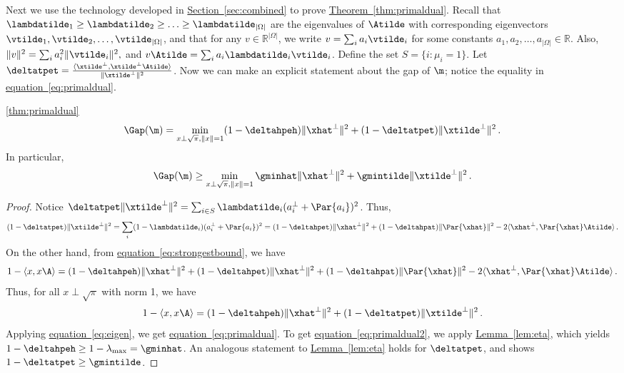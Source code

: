 \documentclass[11pt]{article}
\providecommand{\R}{{\mathbb R}}
\providecommand{\expref}[2]{\texorpdfstring{\hyperref[#2]{#1~\ref{#2}}}{#1~\ref{#2}}}
\providecommand{\expeqref}[2]{\texorpdfstring{\hyperref[#2]{#1~\eqref{#2}}}{#1~\eqref{#2}}}
\providecommand{\Perp}[1]{#1^{\perp}}
\begin{document}
Next we use the technology developed in \expref{Section}{sec:combined} to 
prove \expref{Theorem}{thm:primaldual}. Recall that 
$\lambdatilde_1\geq\lambdatilde_2\geq\ldots\geq 
\lambdatilde_{|\Omega|}$ are the eigenvalues of $\Atilde$ with 
corresponding eigenvectors $\vtilde_1,\vtilde_2,\ldots, 
\vtilde_{|\Omega|}$, and that for any $v \in \R^{|\Omega|}$, we write 
$v=\sum_{i}a_i\vtilde_i$ for some constants $a_1,a_2,\ldots, 
a_{|\Omega|} \in \R$.  Also, $\|v\|^2 = \sum_i a_i^2\|\vtilde_i\|^2,$ 
and $v\Atilde = \sum_i a_i\lambdatilde_i\vtilde_i$. Define the set 
$S=\{i:\mu_i=1\}$. Let 
$\deltatpet = \frac{\langle\Perp{\xtilde},\Perp{\xtilde}\Atilde\rangle}{\|\Perp{\xtilde}\|^2}$.
 Now we can make an explicit statement about the gap 
of $\m$; notice the equality in \expeqref{equation}{eq:primaldual}.  
\begin{customthm}{\ref{thm:primaldual}}
\begin{equation}\label{eq:primaldual}
\Gap(\m)= \min_{x\perp \sqrt{\pi}, \|x\|=1} (1-\deltahpeh)\|\Perp{\xhat}\|^2+
(1-\deltatpet)\|\Perp{\xtilde}\|^2\,.
\end{equation}
In particular,
\begin{equation}\label{eq:primaldual2}
\Gap(\m)\geq \min_{x\perp \sqrt{\pi}, \|x\|=1}  
\gminhat\|\Perp{\xhat}\|^2+\gmintilde\|\Perp{\xtilde}\|^2\,.
\end{equation}
\end{customthm}

\begin{proof}
Notice $\deltatpet\|\Perp{\xtilde}\|^2 = \sum_{i\in S}\lambdatilde_i(\Perp{a_i}+\Par{a_i})^2$.
Thus,
\[(1-\deltatpet)\|\Perp{\xtilde}\|^2 = \sum_{i}(1-\lambdatilde_i)(\Perp{a_i}+\Par{a_i})^2
   = (1-\deltahpet)\|\Perp{\xhat}\|^2 + (1-\deltahpat)\|\Par{\xhat}\|^2 - 
   2\langle \Perp{\xhat},\Par{\xhat}\Atilde\rangle\,.\]
On the other hand, from \expeqref{equation}{eq:strongestbound}, we have
\[1-\langle x,x\A\rangle = (1-\deltahpeh)\|\Perp{\xhat}\|^2+(1-\deltahpet)\|\Perp{\xhat}\|^2+
(1-\deltahpat)\|\Par{\xhat}\|^2 - 2\langle \Perp{\xhat},\Par{\xhat}\Atilde\rangle\,.\]
Thus, for all $x\perp \sqrt{\pi}$ with norm 1, we have
\[1-\langle x,x\A\rangle=(1-\deltahpeh)\|\Perp{\xhat}\|^2+(1-\deltatpet)\|\Perp{\xtilde}\|^2\,.\]
Applying \expeqref{equation}{eq:eigen}, we get \expeqref{equation}{eq:primaldual}.
To get \expeqref{equation}{eq:primaldual2}, we apply \expref{Lemma}{lem:eta}, which yields
$1-\deltahpeh \geq 1-\lambda_{\max} = \gminhat$.  An analogous statement
to \expref{Lemma}{lem:eta} holds for $\deltatpet$, and shows 
$1-\deltatpet \geq \gmintilde$. 
\end{proof}
\end{document}
